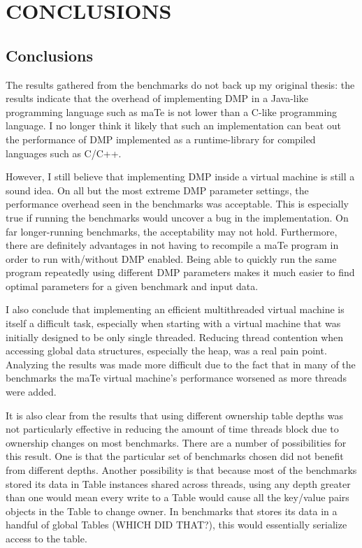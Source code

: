 \chapter{CONCLUSIONS}
\label{CONCLUSIONS}

\section{Conclusions}

The results gathered from the benchmarks do not back up my original
thesis: the results indicate that the overhead of implementing DMP in
a Java-like programming language such as maTe is not lower than a
C-like programming language.  I no longer think it likely that such an
implementation can beat out the performance of DMP implemented as a
runtime-library for compiled languages such as C/C++.


However, I still believe that implementing DMP inside a virtual
machine is still a sound idea.  On all but the most extreme DMP
parameter settings, the performance overhead seen in the benchmarks
was acceptable.  This is especially true if running the benchmarks
would uncover a bug in the implementation.  On far longer-running
benchmarks, the acceptability may not hold.  Furthermore, there are
definitely advantages in not having to recompile a maTe program in
order to run with/without DMP enabled.  Being able to quickly run the
same program repeatedly using different DMP parameters makes it much
easier to find optimal parameters for a given benchmark and input
data.

I also conclude that implementing an efficient multithreaded virtual
machine is itself a difficult task, especially when starting with a
virtual machine that was initially designed to be only single
threaded.  Reducing thread contention when accessing global data
structures, especially the heap, was a real pain point.  Analyzing the
results was made more difficult due to the fact that in many of the
benchmarks the maTe virtual machine's performance worsened as more
threads were added.

It is also clear from the results that using different ownership table
depths was not particularly effective in reducing the amount of time
threads block due to ownership changes on most benchmarks.  There are
a number of possibilities for this result.  One is that the particular
set of benchmarks chosen did not benefit from different depths.
Another possibility is that because most of the benchmarks stored its
data in Table instances shared across threads, using any depth greater
than one would mean every write to a Table would cause all the
key/value pairs objects in the Table to change owner.  In benchmarks
that stores its data in a handful of global Tables (WHICH DID THAT?),
this would essentially serialize access to the table.

